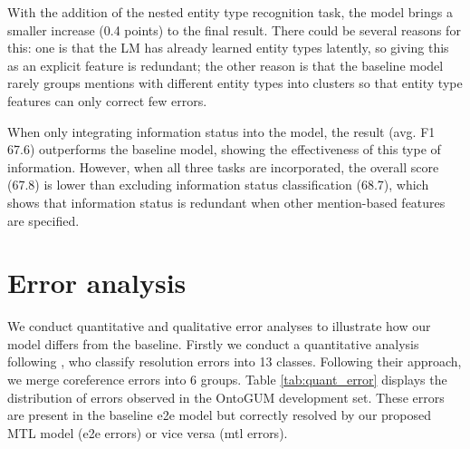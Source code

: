 \documentclass[11pt]{article}
\begin{document}
With the addition of the nested entity type recognition task, the model brings a smaller increase (0.4 points) to the final result. There could be several reasons for this: one is that the LM has already learned entity types latently, so giving this as an explicit feature is redundant; the other reason is that the baseline model rarely groups mentions with different entity types into clusters so that entity type features can only correct few errors.

When only integrating information status into the model, the result (avg. F1 67.6) outperforms the baseline model, showing the effectiveness of this type of information. However, when all three tasks are incorporated, the overall score (67.8) is lower than excluding information status classification (68.7), which shows that information status is redundant when other mention-based features are specified.

\section{Error analysis}
\label{sec:appendix_error}
We conduct quantitative and qualitative error analyses to illustrate how our model differs from the baseline. 
Firstly we conduct a quantitative analysis following \citet{lu-ng-2020-conundrums}, who classify resolution errors into 13 classes. Following their approach, we merge coreference errors into 6 groups. Table \ref{tab:quant_error} displays the distribution of errors observed in the OntoGUM development set. These errors are present in the baseline e2e model but correctly resolved by our proposed MTL model (e2e errors) or vice versa (mtl errors).
\end{document}
